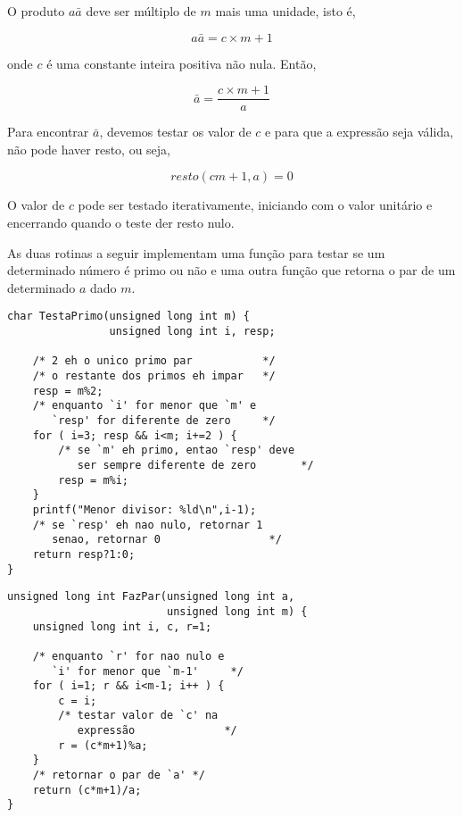 \documentclass[a4paper,12pt,oneside,onecolumn]{uerj/uerj}
\begin{document}
O produto $a\bar a$ deve ser múltiplo de $m$ mais uma unidade, isto é,

\begin{equation}
a\bar a = c\times m+1
\end{equation}

\noindent onde $c$ é uma constante inteira positiva não nula. Então,

\begin{equation}
\bar a = \frac{c\times m+1}{a}
\end{equation}

\noindent Para encontrar $\bar a$, devemos testar os valor de $c$ e para que a expressão seja válida, não pode haver resto, ou seja,

\begin{equation}
resto(cm+1,a)=0
\end{equation}

\noindent O valor de $c$ pode ser testado iterativamente, iniciando com o valor unitário e encerrando quando o teste der resto nulo.

As duas rotinas a seguir implementam uma função para testar se um determinado número é primo ou não e uma outra função que retorna o par de um determinado $a$ dado $m$.

\begin{verbatim}
char TestaPrimo(unsigned long int m) {
                unsigned long int i, resp;

    /* 2 eh o unico primo par           */
    /* o restante dos primos eh impar   */
    resp = m%2;
    /* enquanto `i' for menor que `m' e
       `resp' for diferente de zero     */
    for ( i=3; resp && i<m; i+=2 ) {
        /* se `m' eh primo, entao `resp' deve
           ser sempre diferente de zero       */
        resp = m%i;
    }
    printf("Menor divisor: %ld\n",i-1);
    /* se `resp' eh nao nulo, retornar 1
       senao, retornar 0                 */
    return resp?1:0;
}
\end{verbatim}

\begin{verbatim}
unsigned long int FazPar(unsigned long int a,
                         unsigned long int m) {
    unsigned long int i, c, r=1;

    /* enquanto `r' for nao nulo e 
       `i' for menor que `m-1'     */
    for ( i=1; r && i<m-1; i++ ) {
        c = i;
        /* testar valor de `c' na 
           expressão              */
        r = (c*m+1)%a;
    }
    /* retornar o par de `a' */
    return (c*m+1)/a;
}
\end{verbatim}
\end{document}
